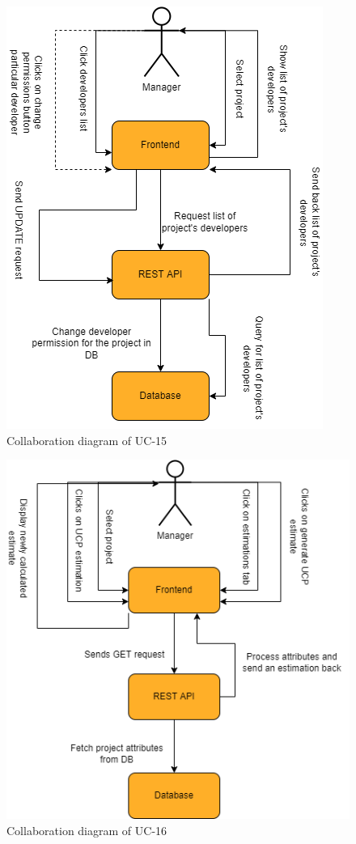 \begin{figure}[H]
    \centering
    \includegraphics[scale=0.5]{./diagrams/collaboration/cd-15.png}
    \caption{Collaboration diagram of UC-15}
    \label{fig:cd-15}
    
\end{figure}


\begin{figure}[H]
    \centering
    \includegraphics[scale=0.5]{./diagrams/collaboration/cd-16.png}
    \caption{Collaboration diagram of UC-16}
    \label{fig:cd-16}
    
\end{figure}


